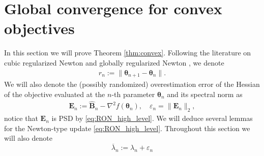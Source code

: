 \documentclass[11pt]{amsart}
\theoremstyle{plain}
\theoremstyle{definition}
\theoremstyle{remark}
\def\bE{\mathbf{E}}
\def\H{\mathbf{H}}
\def\I{\mathbf{I}}
\def\eps{\varepsilon}
\def\B{\mathbf{B}}
\def\param{\boldsymbol{\theta}}
\def\I{\mathbf{I}}
\newcommand{\commHL}[1]{{\textcolor{blue}{#1}}}
\begin{document}
\section{Global convergence for convex objectives}
\label{sec:global_pf}
In this section we will prove Theorem \ref{thm:convex}. Following the literature on cubic regularized Newton \cite{nesterov2006cubic} and globally regularized Newton \cite{mishchenko2023regularized}, we denote 
\begin{align*}
	r_{n}:= \|\param_{n+1}-\param_n\|.
\end{align*}
We will also denote the (possibly randomized) overestimation error of the Hessian of the objective evaluated at the $n$-th parameter $\param_{n}$ and its spectral norm as 
\begin{align*}
	\bE_{n}:=\hat{\B}_n-\nabla^{2} f(\param_{n}), \quad \eps_n=\|\bE_{n}\|_2,
\end{align*}
notice that $\bE_n$ is PSD by \eqref{eq:RON_high_level}. We will deduce several lemmas for the Newton-type update \eqref{eq:RON_high_level}. Throughout this section we will also denote
\[
\overline{\lambda}_n:=\lambda_n+\eps_n
\]



\end{document}
